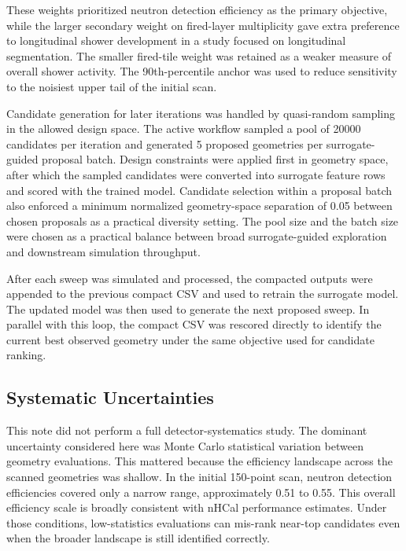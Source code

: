 \noindent These weights prioritized neutron detection efficiency as the primary objective, while the larger secondary weight on fired-layer multiplicity gave extra preference to longitudinal shower
development in a study focused on longitudinal segmentation. The smaller fired-tile weight was retained as a weaker measure of overall shower activity. The 90th-percentile anchor was used
to reduce sensitivity to the noisiest upper tail of the initial scan.

\noindent Candidate generation for later iterations was handled by quasi-random sampling in the allowed design space. The active workflow sampled a pool of 20000 candidates per
iteration and generated 5 proposed geometries per surrogate-guided proposal batch. Design constraints were applied first in geometry space, after which the sampled candidates were converted into surrogate
feature rows and scored with the trained model. Candidate selection within a proposal batch also enforced a minimum normalized geometry-space separation of 0.05 between chosen proposals as a
practical diversity setting. The pool size and the batch size were chosen as a practical balance between broad surrogate-guided exploration and downstream simulation throughput.

\noindent After each sweep was simulated and processed, the compacted outputs were appended to the previous compact CSV and used to retrain the surrogate model. The updated model
was then used to generate the next proposed sweep. In parallel with this loop, the compact CSV was rescored directly to identify the current best observed geometry under the same objective
used for candidate ranking.

\subsection{Systematic Uncertainties}

\noindent This note did not perform a full detector-systematics study. The dominant uncertainty considered here was Monte Carlo statistical variation between geometry evaluations.
This mattered because the efficiency landscape across the scanned geometries was shallow. In the initial 150-point scan, neutron detection efficiencies covered only
a narrow range, approximately 0.51 to 0.55. This overall efficiency scale is broadly consistent with nHCal performance estimates\cite{BrandenburgRiedl:2025nhcalpdr}. Under those conditions, low-statistics
evaluations can mis-rank near-top candidates even when the broader landscape is still identified correctly.

